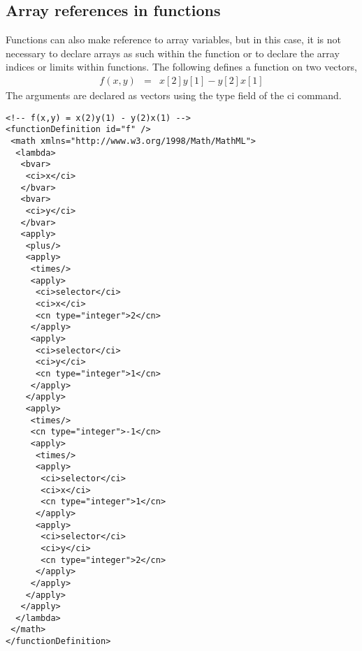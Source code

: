 \subsection{Array references in functions}

Functions can also make reference to array variables, but in this case, it is not necessary to declare arrays as such within the function or to declare the array indices or limits within functions.  The following defines a function on two vectors, 
\begin{eqnarray*}
f(x,y) & = & x[2]y[1] - y[2]x[1]
\end{eqnarray*}
The arguments are declared as vectors using the type field of the ci command.

\clearpage

\begin{verbatim}
<!-- f(x,y) = x(2)y(1) - y(2)x(1) -->
<functionDefinition id="f" />
 <math xmlns="http://www.w3.org/1998/Math/MathML">
  <lambda>
   <bvar>
    <ci>x</ci>
   </bvar>
   <bvar>
    <ci>y</ci>
   </bvar>
   <apply>
    <plus/>
    <apply>
     <times/>
     <apply>
      <ci>selector</ci>
      <ci>x</ci>
      <cn type="integer">2</cn>
     </apply>
     <apply>
      <ci>selector</ci>
      <ci>y</ci>
      <cn type="integer">1</cn>
     </apply>
    </apply>
    <apply>
     <times/>
     <cn type="integer">-1</cn>
     <apply>
      <times/>
      <apply>
       <ci>selector</ci>
       <ci>x</ci>
       <cn type="integer">1</cn>
      </apply>
      <apply>
       <ci>selector</ci>
       <ci>y</ci>
       <cn type="integer">2</cn>
      </apply>
     </apply>
    </apply>
   </apply>
  </lambda>
 </math>
</functionDefinition>
\end{verbatim}



